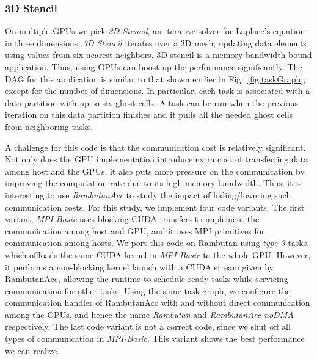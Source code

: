 \subsubsection{3D Stencil}
On multiple GPUs we pick {\em 3D Stencil}, an iterative solver for Laplace's equation in three dimensions.
{\em 3D Stencil} iterates over a 3D mesh, updating data elements using values from six nearest neighbors.
3D stencil is a memory bandwidth bound application. 
Thus, using GPUs can boost up the performance significantly.
The DAG for this application is similar to that shown earlier in Fig.~\ref{fig:taskGraph}, except for the number of dimensions.
In particular, each task is associated with a data partition with up to six ghost cells.
A task can be run when the previous iteration on this data partition finishes and it pulls all the needed ghost cells from neighboring tasks.

A challenge for this code is that the communication cost is relatively significant.
Not only does the GPU implementation introduce extra cost of transferring data among host and the GPUs, it also puts more pressure on the communication by improving the computation rate due to its high memory bandwidth.
Thus, it is interesting to use {\em RambutanAcc} to study the impact of hiding/lowering such communication costs.
For this study, we implement four code variants.
The first variant, {\em MPI-Basic} uses blocking CUDA transfers to implement the communication among host and GPU, and it uses MPI primitives for communication among hosts. 
We port this code on Rambutan using {\em type-3} tasks, which offloads the same CUDA kernel in {\em MPI-Basic} to the whole GPU.
However, it performs a non-blocking kernel launch with a CUDA stream given by RambutanAcc, allowing the runtime to schedule ready tasks while servicing communication for other tasks.
Using the same task graph, we configure the communication handler of RambutanAcc with and without direct communication among the GPUs, and hence the name {\em Rambutan} and {\em RambutanAcc-noDMA} respectively.
The last code variant is not a correct code, since we shut off all types of communication in {\em MPI-Basic}. 
This variant shows the best performance we can realize.

